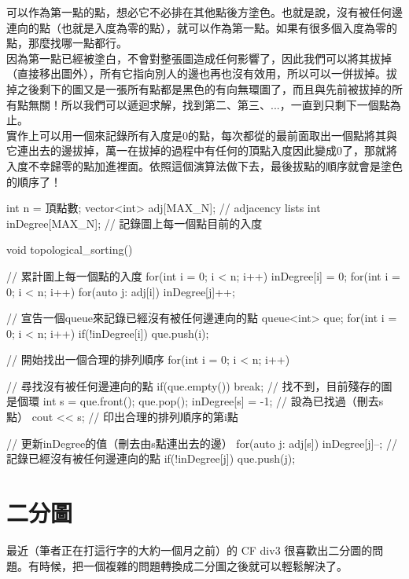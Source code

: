 \documentclass[main.tex]{subfiles}
\begin{document}
可以作為第一點的點，想必它不必排在其他點後方塗色。也就是說，沒有被任何邊連向的點（也就是入度為零的點），就可以作為第一點。如果有很多個入度為零的點，那麼找哪一點都行。\\

因為第一點已經被塗白，不會對整張圖造成任何影響了，因此我們可以將其拔掉（直接移出圖外），所有它指向別人的邊也再也沒有效用，所以可以一併拔掉。拔掉之後剩下的圖又是一張所有點都是黑色的有向無環圖了，而且與先前被拔掉的所有點無關！所以我們可以遞迴求解，找到第二、第三、...，一直到只剩下一個點為止。\\

實作上可以用一個來記錄所有入度是$0$的點，每次都從的最前面取出一個點將其與它連出去的邊拔掉，萬一在拔掉的過程中有任何的頂點入度因此變成$0$了，那就將入度不幸歸零的點加進裡面。依照這個演算法做下去，最後拔點的順序就會是塗色的順序了！\\

\begin{C++}
int n = 頂點數;
vector<int> adj[MAX_N]; // adjacency lists
int inDegree[MAX_N];     // 記錄圖上每一個點目前的入度

void topological_sorting(){
    // 累計圖上每一個點的入度
    for(int i = 0; i < n; i++) inDegree[i] = 0;
    for(int i = 0; i < n; i++)
        for(auto j: adj[i])
            inDegree[j]++;

    // 宣告一個queue來記錄已經沒有被任何邊連向的點
    queue<int> que;
    for(int i = 0; i < n; i++)
        if(!inDegree[i]) que.push(i);

    // 開始找出一個合理的排列順序
    for(int i = 0; i < n; i++){
        // 尋找沒有被任何邊連向的點
        if(que.empty()) break; // 找不到，目前殘存的圖是個環
        int s = que.front(); que.pop();
        inDegree[s] = -1;      // 設為已找過（刪去s點）
        cout << s;             // 印出合理的排列順序的第i點

        // 更新inDegree的值（刪去由s點連出去的邊）
        for(auto j: adj[s]){
            inDegree[j]--;
            // 記錄已經沒有被任何邊連向的點
            if(!inDegree[j]) que.push(j);
        }
    }
}
\end{C++}

\section{二分圖}

最近（筆者正在打這行字的大約一個月之前）的 CF div3 很喜歡出二分圖的問題。有時候，把一個複雜的問題轉換成二分圖之後就可以輕鬆解決了。\\
\end{document}
